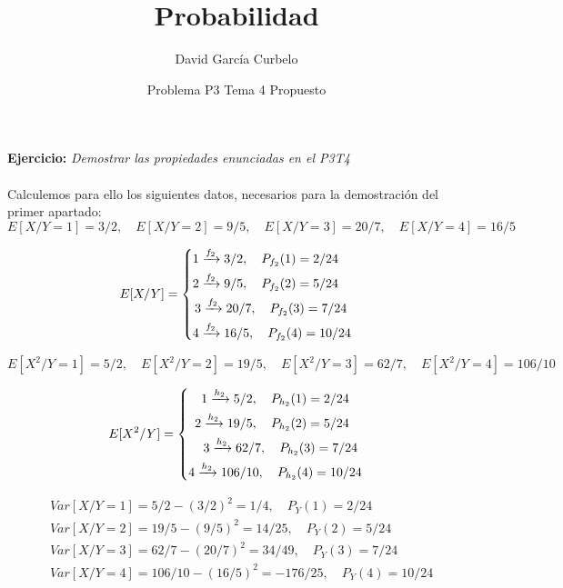 \documentclass[fleqn]{article}
\author{David García Curbelo}
\title{Probabilidad}
\date{Problema P3 Tema 4 Propuesto}
\begin{document}
    \maketitle
    \setcounter{page}{1}
    \pagestyle{plain}
    
    \textbf{Ejercicio: } \textit{Demostrar las propiedades enunciadas en el P3T4 }\\ \\

    Calculemos para ello los siguientes datos, necesarios para la demostración del primer apartado:
$$
    E[X/Y=1]=3/2, \quad
    E[X/Y=2]=9/5, \quad 
    E[X/Y=3]=20/7, \quad 
    E[X/Y=4]=16/5 
$$

$$
    E[X/Y]= \left\{
    \begin{aligned}
        1 \xrightarrow{f_2} 3/2  ,\quad P_{f_2}(1)=2/24 \quad\\
        2 \xrightarrow{f_2} 9/5 ,\quad P_{f_2}(2)=5/24 \quad\\
        3 \xrightarrow{f_2} 20/7 ,\quad P_{f_2}(3)=7/24 \thinspace \thinspace\\
        4 \xrightarrow{f_2} 16/5 ,\quad P_{f_2}(4)=10/24\\
    \end{aligned}
    \right.
$$

$$
    E[X^2/Y=1]=5/2, \quad
    E[X^2/Y=2]=19/5, \quad 
    E[X^2/Y=3]=62/7, \quad 
    E[X^2/Y=4]=106/10 
$$

$$
    E[X^2/Y]= \left\{
    \begin{aligned}
        1 \xrightarrow{h_2} 5/2  ,\quad P_{h_2}(1)=2/24 \quad\\
        2 \xrightarrow{h_2} 19/5 ,\quad P_{h_2}(2)=5/24 \quad\\
        3 \xrightarrow{h_2} 62/7 ,\quad P_{h_2}(3)=7/24 \thinspace \thinspace\\
        4 \xrightarrow{h_2} 106/10 ,\quad P_{h_2}(4)=10/24\\
    \end{aligned}
    \right.
$$


    
    \begin{align*}
        &Var[X/Y=1] = 5/2 - (3/2)^2 = 1/4, \quad  P_Y(1) = 2/24\\
        &Var[X/Y=2] = 19/5 - (9/5)^2 = 14/25, \quad  P_Y(2) = 5/24\\
        &Var[X/Y=3] = 62/7 - (20/7)^2 = 34/49, \quad  P_Y(3) = 7/24 \\
        &Var[X/Y=4] = 106/10 - (16/5)^2 = -176/25, \quad  P_Y(4) = 10/24\\
    \end{align*}
\end{document}
